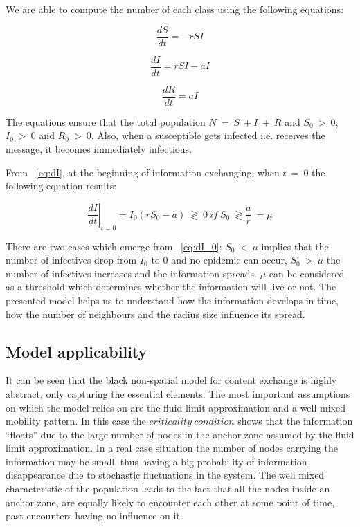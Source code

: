 We are able to compute the number of each class using the following equations:

\begin{equation}
\frac{dS}{dt} = -rSI \label{eq:dS}
\end{equation}

\begin{equation}
\frac{dI}{dt} = rSI - aI \label{eq:dI}
\end{equation}

\begin{equation}
\frac{dR}{dt} = aI \label{eq:dR}
\end{equation}

The equations ensure that the total population $N\ =\ S\ + I\ +\ R$ and $S_{0}\
>\ 0$, $I_{0}\ >\ 0$ and $R_{0}\ >\ 0$. Also, when a susceptible gets infected
i.e. receives the message, it becomes immediately infectious.

From ~\eqref{eq:dI}, at the beginning of information exchanging, when $t\ =\ 0$
the following equation results:

\begin{equation}
\left.
\frac{dI}{dt}
\right|_{t=0} = I_{0} (rS_{0} - a)\ \gtrless\ 0\ if\ S_{0}\ \gtrless
\frac{a}{r}\ = \mu
\label{eq:dI_0}
\end{equation}

There are two cases which emerge from ~\eqref{eq:dI_0}: $S_{0}\ <\ \mu$ implies
that the number of infectives drop from $I_{0}$ to 0 and no epidemic can occur,
$S_{0}\ >\ \mu$ the number of infectives increases and the information spreads.
$\mu$ can be considered as a threshold which determines whether the information
will live or not. The presented model helps us to understand how the information
develops in time, how the number of neighbours and the radius size influence its
spread.

\subsection{Model applicability}

It can be seen that the black non-spatial model for content exchange is highly
abstract, only capturing the essential elements. The most important assumptions
on which the model relies on are the fluid limit approximation and a well-mixed
mobility pattern. In this case the $criticality\ condition$ shows that the
information ``floats'' due to the large number of nodes in the anchor zone
assumed by the fluid limit approximation. In a real case situation the number of
nodes carrying the information may be small, thus having a big probability of
information disappearance due to stochastic fluctuations in the system. The well
mixed characteristic of the population leads to the fact that all the nodes
inside an anchor zone, are equally likely to encounter each other at some point
of time, past encounters having no influence on it.

